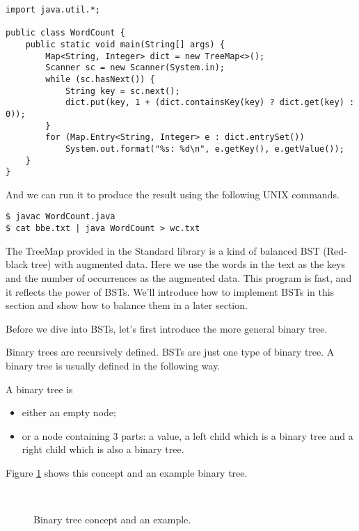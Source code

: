 \documentclass{article}
\begin{document}
\lstset{language=Java}
\begin{lstlisting}
import java.util.*;

public class WordCount {
    public static void main(String[] args) {
        Map<String, Integer> dict = new TreeMap<>();
        Scanner sc = new Scanner(System.in);
        while (sc.hasNext()) {
            String key = sc.next();
            dict.put(key, 1 + (dict.containsKey(key) ? dict.get(key) : 0));
        }
        for (Map.Entry<String, Integer> e : dict.entrySet())
            System.out.format("%s: %d\n", e.getKey(), e.getValue());
    }
}
\end{lstlisting}

And we can run it to produce the result using the following UNIX commands.

\begin{verbatim}
$ javac WordCount.java
$ cat bbe.txt | java WordCount > wc.txt
\end{verbatim}

The TreeMap provided in the Standard library is a kind of balanced BST (Red-black tree)
with augmented data. Here we use the words in the text as the keys and the number of
occurrences as the augmented data. This program is fast, and it reflects the power of
BSTs. We'll introduce how to implement BSTs in this section and show how
to balance them in a later section.

Before we dive into BSTs, let's first introduce the more general binary tree.

Binary trees are recursively defined. BSTs are just one
type of binary tree. A binary tree is usually defined in the following way.

A binary tree is
\begin{itemize}
\item either an empty node;
\item or a node containing 3 parts: a value, a left child which is a binary tree and a
right child which is also a binary tree.
\end{itemize}

Figure \ref{fig:binary-tree-example} shows this concept and an example binary tree.

\begin{figure}[htbp]
  \centering
   \\
  \caption{Binary tree concept and an example.}
  \label{fig:binary-tree-example}
\end{figure}
\end{document}
